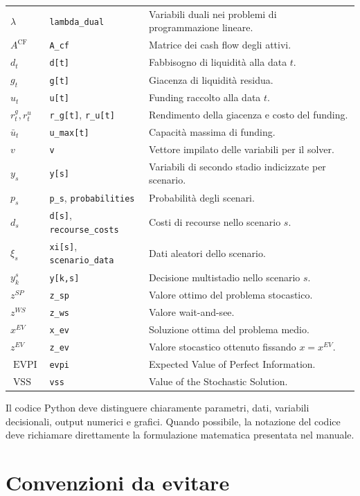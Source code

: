 \documentclass[12pt,a4paper]{article}
\newcommand{\1}{\mathbf{1}}
\newcommand{\EVPI}{\operatorname{EVPI}}
\newcommand{\VSS}{\operatorname{VSS}}
\begin{document}
\begin{longtable}{>{\raggedright}p{4.0cm}>{\raggedright}p{4.2cm}>{\raggedright\arraybackslash}p{5.8cm}}
$\lambda$ & \texttt{lambda\_dual} & Variabili duali nei problemi di programmazione lineare.\\
$A^{\mathrm{CF}}$ & \texttt{A\_cf} & Matrice dei cash flow degli attivi.\\
$d_t$ & \texttt{d[t]} & Fabbisogno di liquidit\`a alla data $t$.\\
$g_t$ & \texttt{g[t]} & Giacenza di liquidit\`a residua.\\
$u_t$ & \texttt{u[t]} & Funding raccolto alla data $t$.\\
$r_t^{g},r_t^{u}$ & \texttt{r\_g[t]}, \texttt{r\_u[t]} & Rendimento della giacenza e costo del funding.\\
$\bar u_t$ & \texttt{u\_max[t]} & Capacit\`a massima di funding.\\
$v$ & \texttt{v} & Vettore impilato delle variabili per il solver.\\
$y_s$ & \texttt{y[s]} & Variabili di secondo stadio indicizzate per scenario.\\
$p_s$ & \texttt{p\_s}, \texttt{probabilities} & Probabilit\`a degli scenari.\\
$d_s$ & \texttt{d[s]}, \texttt{recourse\_costs} & Costi di recourse nello scenario $s$.\\
$\xi_s$ & \texttt{xi[s]}, \texttt{scenario\_data} & Dati aleatori dello scenario.\\
$y_k^s$ & \texttt{y[k,s]} & Decisione multistadio nello scenario $s$.\\
$z^{SP}$ & \texttt{z\_sp} & Valore ottimo del problema stocastico.\\
$z^{WS}$ & \texttt{z\_ws} & Valore wait-and-see.\\
$x^{EV}$ & \texttt{x\_ev} & Soluzione ottima del problema medio.\\
$z^{EV}$ & \texttt{z\_ev} & Valore stocastico ottenuto fissando $x=x^{EV}$.\\
$\EVPI$ & \texttt{evpi} & Expected Value of Perfect Information.\\
$\VSS$ & \texttt{vss} & Value of the Stochastic Solution.\\
\hline
\end{longtable}

Il codice Python deve distinguere chiaramente parametri, dati, variabili
decisionali, output numerici e grafici. Quando possibile, la notazione del
codice deve richiamare direttamente la formulazione matematica presentata nel
manuale.

\section{Convenzioni da evitare}
\end{document}
